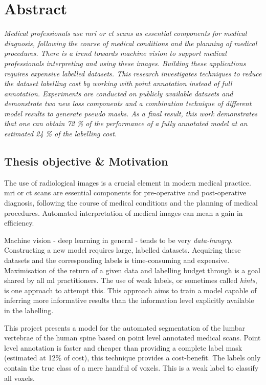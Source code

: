\chapter*{Abstract}

\begin{multicols}{2}
\thispagestyle{plain}
\par{
    \textit{
        Medical professionals use \acrfull{mri} or \acrfull{ct} scans as essential components for medical diagnosis, following the course of medical conditions and the planning of medical procedures.
        There is a trend towards machine vision to support medical professionals interpreting and using these images.
        Building these applications requires expensive labelled datasets.
        This research investigates techniques to reduce the dataset labelling cost by working with point annotation instead of full annotation.
        Experiments are conducted on publicly available datasets and demonstrate two new loss components and a combination technique of different model results to generate pseudo masks.
        As a final result, this work demonstrates that one can obtain 72 \% of the performance of a fully annotated model at an estimated 24 \% of the labelling cost. 
    }
}
\section*{Thesis objective \& Motivation}
\par{
    The use of radiological images is a crucial element in modern medical practice. 
    \acrshort{mri} or \acrshort{ct} scans are essential components for pre-operative and post-operative diagnosis, following the course of medical conditions and the planning of medical procedures.
    Automated interpretation of medical images can mean a gain in efficiency.
}
\par{
    Machine vision - deep learning in general - tends to be very \textit{data-hungry}. Constructing a new model requires large, labelled datasets.
    Acquiring these datasets and the corresponding labels is time-consuming and expensive. 
    Maximisation of the return of a given data and labelling budget through is a goal shared by all \acrshort{ml} practitioners.
    The use of weak labels, or sometimes called \textit{hints}, is one approach to attempt this.
    This approach aims to train a model capable of inferring more informative results than the information level explicitly available in the labelling.
}
\par{
    This project presents a model for the automated segmentation of the lumbar vertebrae of the human spine based on point level annotated medical scans.
    Point level annotation is faster and cheaper than providing a complete label mask (estimated at 12\% of cost\cite{Bearman2015}), this technique provides a cost-benefit. 
    The labels only contain the true class of a mere handful of voxels. This is a weak label to classify all voxels.
}




\end{multicols}
